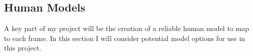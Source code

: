 \subsection{Human Models}

A key part of my project will be the creation of a reliable human model to map to each frame. In this section I will consider potential model options for use in this project.




